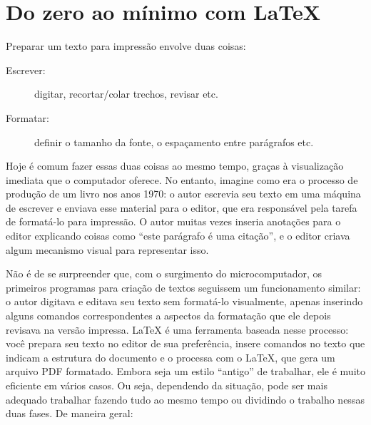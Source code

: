 \chapter{Do zero ao mínimo com \LaTeX{}}

Preparar um texto para impressão envolve duas coisas:

\begin{description}
\item[Escrever:] digitar, recortar/colar trechos, revisar etc.
\item[Formatar:] definir o tamanho da fonte, o
espaçamento entre parágrafos etc.
\end{description}

Hoje é comum fazer essas duas coisas ao mesmo tempo, graças à visualização
imediata que o computador oferece. No entanto, imagine como era o processo de
produção de um livro nos anos 1970: o autor escrevia seu texto em uma máquina
de escrever e enviava esse material para o editor, que era responsável pela
tarefa de formatá-lo para impressão. O autor muitas vezes inseria anotações
para o editor explicando coisas como ``este parágrafo é uma citação'', e o
editor criava algum mecanismo visual para representar isso.

Não é de se surpreender que, com o surgimento do microcomputador, os primeiros
programas para criação de textos seguissem um funcionamento similar: o autor
digitava e editava seu texto sem formatá-lo visualmente, apenas inserindo
alguns comandos correspondentes a aspectos da formatação que ele depois
revisava na versão impressa. \LaTeX{} é uma ferramenta baseada nesse processo:
você prepara seu texto no editor de sua preferência, insere comandos no texto
que indicam a estrutura do documento e o processa com o \LaTeX{}, que gera um
arquivo PDF formatado. Embora seja um estilo ``antigo'' de trabalhar, ele é
muito eficiente em vários casos. Ou seja, dependendo da situação, pode ser
mais adequado trabalhar fazendo tudo ao mesmo tempo ou dividindo o trabalho
nessas duas fases. De maneira geral:

